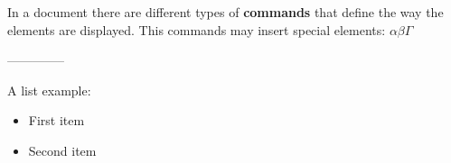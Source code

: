 \documentclass{article}
\begin{document}
	In a document there are different types of \textbf{commands} 
	that define the way the elements are displayed. This 
	commands may insert special elements: $\alpha \beta \Gamma$
	
	--------------
	
	A list example:
	\begin{itemize}
		\item[\S] First item
		\item Second item
	\end{itemize}
\end{document}
